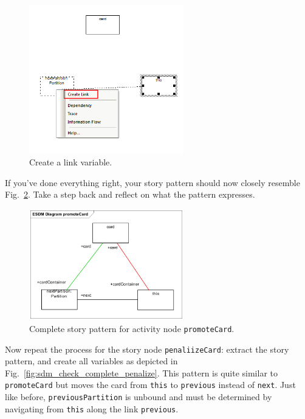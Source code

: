 \begin{figure}[htbp]
\begin{center}
  \includegraphics[width=0.6\textwidth]{pics/sdmBilder/check/sdm26}
  \caption{Create a link variable.}  
  \label{fig:sdm_check_link_variable}
\end{center}
\end{figure}

If you've done everything right, your story pattern should now closely resemble
Fig.~\ref{fig:sdm_check_complete_activity_node}.  Take a step back and reflect
on what the pattern expresses.

\begin{figure}[htbp] 
\begin{center}
  \includegraphics[width=0.6\textwidth]{pics/sdmBilder/check/sdm30}
  \caption{Complete story pattern for activity node \texttt{promoteCard}.}  
  \label{fig:sdm_check_complete_activity_node}
\end{center}
\end{figure}

\clearpage

Now repeat the process for the story node \texttt{penaliizeCard}: extract the
story pattern, and create all variables as depicted in
Fig.~\ref{fig:sdm_check_complete_penalize}.  This pattern is quite similar to
\texttt{promoteCard} but moves the card from \texttt{this} to \texttt{previous}
instead of \texttt{next}.  Just like before, \texttt{previousPartition} is
unbound and must be determined by navigating from \texttt{this} along the link
\texttt{previous}.


